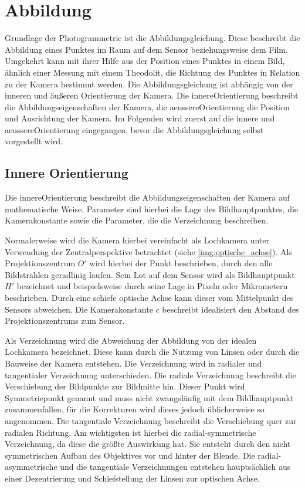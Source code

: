 \documentclass[./00PhotoBox.tex]{subfiles}
\begin{document}
\section{Abbildung}
\label{s:abbildung}
Grundlage der Photogrammetrie ist die Abbildungsgleichung. Diese beschreibt die Abbildung eines Punktes im Raum auf dem Sensor beziehungsweise dem Film. Umgekehrt kann mit ihrer Hilfe aus der Position eines Punktes in einem Bild, ähnlich einer Messung mit einem Theodolit, die Richtung des Punktes in Relation zu der Kamera bestimmt werden. Die Abbildungsgleichung ist abhängig von der inneren und äußeren Orientierung der Kamera. Die \gls{innereOrientierung} beschreibt die Abbildungseigenschaften der Kamera, die \gls{aeussereOrientierung} die Position und Ausrichtung der Kamera. Im Folgenden wird zuerst auf die innere und \gls{aeussereOrientierung} eingegangen, bevor die Abbildungsgleichung selbst vorgestellt wird.

\subsection{Innere Orientierung}
\label{s:innereorientierung}
Die \gls{innereOrientierung} beschreibt die Abbildungseigenschaften der Kamera auf mathematische Weise. Parameter sind hierbei die Lage des \Gls{Bildhauptpunkt}es, die Kamerakonstante sowie die Parameter, die die \Gls{Verzeichnung} beschreiben. \citep[vgl.][S. 179f]{luhmann}

Normalerweise wird die Kamera hierbei vereinfacht als Lochkamera unter Verwendung der Zentralperspektive betrachtet (siehe \autoref{img:optische_achse}). Als Projektionszentrum $O'$ wird hierbei der Punkt beschrieben, durch den alle Bildstrahlen geradlinig laufen. Sein Lot auf dem Sensor wird als \Gls{Bildhauptpunkt} $H'$ bezeichnet und beispielsweise durch seine Lage in Pixeln oder Mikrometern beschrieben. Durch eine schiefe optische Achse kann dieser vom Mittelpunkt des Sensors abweichen. Die \Gls{Kamerakonstante} $c$ beschreibt idealisiert den Abstand des Projektionszentrums zum Sensor. \citep[vgl.][S. 177]{luhmann}

Als \Gls{Verzeichnung} wird die Abweichung der Abbildung von der idealen Lochkamera bezeichnet. Diese kann durch die Nutzung von Linsen oder durch die Bauweise der Kamera entstehen. Die \Gls{Verzeichnung} wird in radialer und tangentialer \Gls{Verzeichnung} unterschieden. Die radiale \Gls{Verzeichnung} beschreibt die Verschiebung der Bildpunkte zur Bildmitte hin. Dieser Punkt wird Symmetriepunkt genannt und muss nicht zwangsläufig mit dem Bildhauptpunkt zusammenfallen, für die Korrekturen wird dieses jedoch üblicherweise so angenommen. Die tangentiale \Gls{Verzeichnung} beschreibt die Verschiebung quer zur radialen Richtung. Am wichtigsten ist hierbei die radial-symmetrische \Gls{Verzeichnung}, da diese die größte Auswirkung hat. Sie entsteht durch den nicht symmetrischen Aufbau des Objektives vor und hinter der Blende. Die radial-asymmetrische und die tangentiale \Gls{Verzeichnung}en entstehen hauptsächlich aus einer Dezentrierung und Schiefstellung der Linsen zur optischen Achse. \citep[vgl.][S. 178]{luhmann}
\end{document}

